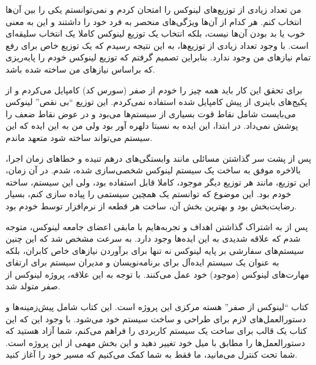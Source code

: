 \documentclass{book}
\begin{document}
\par
من تعداد زیادی از توزیع‌های لینوکس را امتحان کردم و نمی‌توانستم یکی را بین آن‌ها انتخاب کنم. هر کدام از آن‌ها ویژگی‌های منحصر به فرد خود را داشتند و این به معنی خوب یا بد بودن آن‌ها نیست، بلکه انتخاب یک توزیع لینوکس کاملا یک انتخاب سلیقه‌ای است. با وجود تعداد زیادی از توزیع‌ها، به این نتیجه رسیدم که یک توزیع خاص برای رفع تمام نیاز‌های من وجود ندارد. بنابراین تصمیم گرفتم که توزیع لینوکس خودم را پایه‌ریزی که براساس نیاز‌های من ساخته شده باشد.
\newline

\par
برای تحقق این کار باید همه چیز را خودم از صفر (سورس کد) کامپایل می‌کردم و از پکیج‌های باینری از پیش کامپایل شده استفاده نمی‌کردم. این توزیع “بی نقص” لینوکس می‌بایست شامل نقاط قوت بسیاری از سیستم‌ها می‌بود و در عوض نقاط ضعف را پوشش نمی‌داد. در ابتدا، این ایده به نسبتا دلهره آور بود ولی من به این ایده که این سیستم می‌تواند ساخته شود متعهد ماندم.
\newline

\par
پس از پشت سر گذاشتن مسائلی مانند وابستگی‌های درهم تنیده و خطا‌های زمان اجرا، بالاخره موفق به ساخت یک سیستم لینوکس شخصی‌سازی شده، شدم. در آن زمان، این توزیع، مانند هر توزیع دیگر موجود، کاملا قابل استفاده بود، ولی این سیستم، ساخته خودم بود. این موضوع که توانستم یک همچین سیستمی را پیاده سازی کنم، بسیار رضایت‌بخش بود و بهترین بخش آن، ساخت هر قطعه از نرم‌افزار توسط خودم بود.
\newline

\par
پس از به اشتراک گذاشتن اهداف و تجربه‌هایم با مابقی اعضای جامعه لینوکس، متوجه شدم که علاقه شدیدی به این ایده‌ها وجود دارد. به سرعت مشخص شد که این چنین سیستم‌های سفارشی بر پایه لینوکس نه تنها برای برآوردن نیاز‌های خاص کابران، بلکه به عنوان یک سیستم ایده‌آل برای برنامه‌نویسان و مدیران سیستم برای ارتقای مهارت‌های لینوکس (موجود) خود عمل می‌کنند. با توجه به این علاقه، پروژه لینوکس از صفر متولد شد.
\newline

\par
کتاب “لینوکس از صفر” هسته مرکزی این پروژه است. این کتاب شامل پیش‌زمینه‌ها و دستورالعمل‌های لازم برای طراحی و ساخت سیستم خود می‌شود. با وجود این که این کتاب یک قالب برای ساخت یک سیستم کاربردی را فراهم می‌کنم، شما آزاد هستید که دستورالعمل‌ها را مطابق با میل خود تغییر دهید و این بخش مهمی از این پروژه است. شما تحت کنترل می‌مانید، ما فقط به شما کمک می‌کنیم که مسیر خود را آغاز کنید.
\newline
\end{document}
